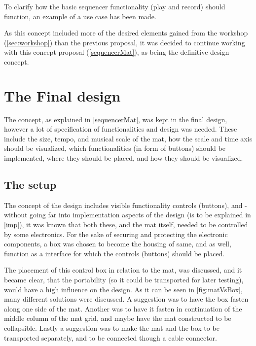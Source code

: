 To clarify how the basic sequencer functionality (play and record) should function, an example of a use case has been made. 
  

As this concept included more of the desired elements gained from the workshop (\autoref{sec:workshop}) than the previous proposal,
it was decided to continue working with this concept proposal (\autoref{sequencerMat}), as being the definitive design concept.  

\section{The Final design}\label{designConcept}
The concept, as explained in \autoref{sequencerMat}, was kept in the final design, however a lot of specification of functionalities and design was needed. These include the size, tempo, and musical scale of the mat, how the scale and time axis should be visualized, which functionalities (in form of buttons) should be implemented, where they should be placed, and how they should be visualized. 


\subsection{The setup}
The concept of the design includes visible functionality controls (buttons), and - without going far into implementation aspects of the design (is to be explained in \autoref{imp}), it was known that both these, and the mat itself, needed to be controlled by some electronics. For the sake of securing and protecting the electronic components, a box was chosen to become the housing of same, and as well, function as a interface for which the controls (buttons) should be placed. 

The placement of this control box in relation to the mat, was discussed, and it became clear, that the portability (so it could be transported for later testing), would have a high influence on the design. As it can be seen in \autoref{fig:matVsBox}, many different solutions were discussed. A suggestion was to have the box fasten along one side of the mat. Another was to have it fasten in continuation of the middle column of the mat grid, and maybe have the mat constructed to be collapsible. Lastly a suggestion was to make the mat and the box to be transported separately, and to be connected though a cable connector.     

